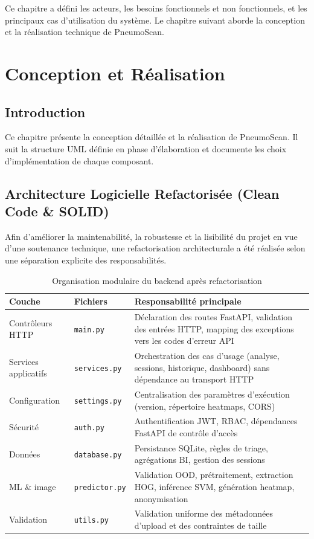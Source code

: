 \documentclass[12pt, a4paper]{report}
\begin{document}
Ce chapitre a défini les acteurs, les besoins fonctionnels et non fonctionnels,
et les principaux cas d'utilisation du système. Le chapitre suivant aborde
la conception et la réalisation technique de PneumoScan.

\chapter{Conception et Réalisation}

\section{Introduction}

Ce chapitre présente la conception détaillée et la réalisation de PneumoScan.
Il suit la structure UML définie en phase d'élaboration et documente les choix
d'implémentation de chaque composant.

\section{Architecture Logicielle Refactorisée (Clean Code \& SOLID)}

Afin d'améliorer la maintenabilité, la robustesse et la lisibilité du projet
en vue d'une soutenance technique, une refactorisation architecturale a été
réalisée selon une séparation explicite des responsabilités.

\begin{table}[H]
\centering
\caption{Organisation modulaire du backend après refactorisation}
\begin{tabularx}{\textwidth}{L{3.2cm} L{3.8cm} X}
\toprule
\textbf{Couche} & \textbf{Fichiers} & \textbf{Responsabilité principale} \\
\midrule
Contrôleurs HTTP & \texttt{main.py} & Déclaration des routes FastAPI, validation des entrées HTTP, mapping des exceptions vers les codes d'erreur API \\
Services applicatifs & \texttt{services.py} & Orchestration des cas d'usage (analyse, sessions, historique, dashboard) sans dépendance au transport HTTP \\
Configuration & \texttt{settings.py} & Centralisation des paramètres d'exécution (version, répertoire heatmaps, CORS) \\
Sécurité & \texttt{auth.py} & Authentification JWT, RBAC, dépendances FastAPI de contrôle d'accès \\
Données & \texttt{database.py} & Persistance SQLite, règles de triage, agrégations BI, gestion des sessions \\
ML \& image & \texttt{predictor.py} & Validation OOD, prétraitement, extraction HOG, inférence SVM, génération heatmap, anonymisation \\
Validation & \texttt{utils.py} & Validation uniforme des métadonnées d'upload et des contraintes de taille \\
\bottomrule
\end{tabularx}
\end{table}
\end{document}
